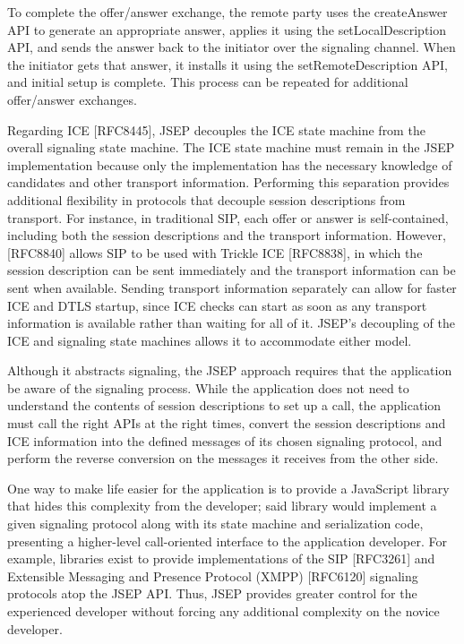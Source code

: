 \documentclass{article}
\begin{document}
To complete the offer/answer exchange, the remote party uses the
createAnswer API to generate an appropriate answer, applies it using
the setLocalDescription API, and sends the answer back to the
initiator over the signaling channel.  When the initiator gets that
answer, it installs it using the setRemoteDescription API, and
initial setup is complete.  This process can be repeated for
additional offer/answer exchanges.

Regarding ICE [RFC8445], JSEP decouples the ICE state machine from
the overall signaling state machine.  The ICE state machine must
remain in the JSEP implementation because only the implementation has
the necessary knowledge of candidates and other transport
information.  Performing this separation provides additional
flexibility in protocols that decouple session descriptions from
transport.  For instance, in traditional SIP, each offer or answer is
self-contained, including both the session descriptions and the
transport information.  However, [RFC8840] allows SIP to be used with
Trickle ICE [RFC8838], in which the session description can be sent
immediately and the transport information can be sent when available.
Sending transport information separately can allow for faster ICE and
DTLS startup, since ICE checks can start as soon as any transport
information is available rather than waiting for all of it.  JSEP's
decoupling of the ICE and signaling state machines allows it to
accommodate either model.

Although it abstracts signaling, the JSEP approach requires that the
application be aware of the signaling process.  While the application
does not need to understand the contents of session descriptions to
set up a call, the application must call the right APIs at the right
times, convert the session descriptions and ICE information into the
defined messages of its chosen signaling protocol, and perform the
reverse conversion on the messages it receives from the other side.

One way to make life easier for the application is to provide a
JavaScript library that hides this complexity from the developer;
said library would implement a given signaling protocol along with
its state machine and serialization code, presenting a higher-level
call-oriented interface to the application developer.  For example,
libraries exist to provide implementations of the SIP [RFC3261] and
Extensible Messaging and Presence Protocol (XMPP) [RFC6120] signaling
protocols atop the JSEP API.  Thus, JSEP provides greater control for
the experienced developer without forcing any additional complexity
on the novice developer.
\end{document}
